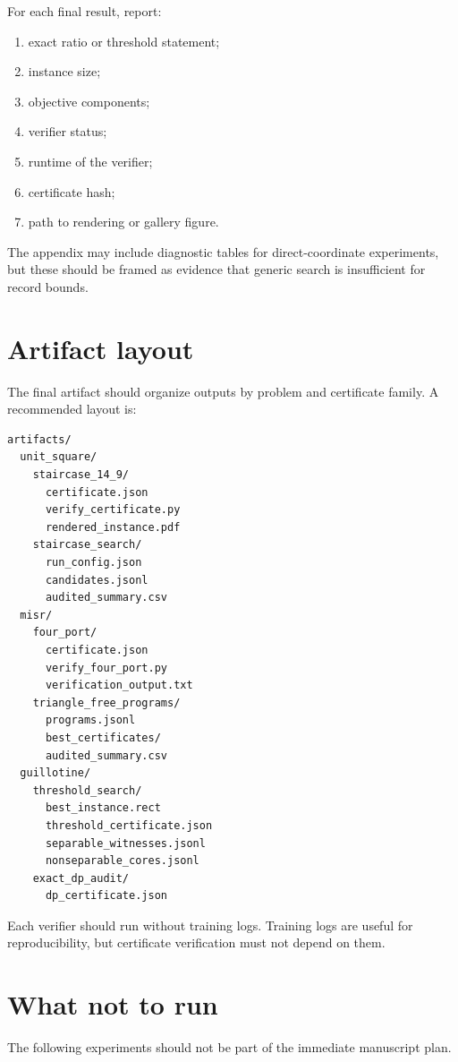 \documentclass[11pt]{article}
\begin{document}
For each final result, report:
\begin{enumerate}
\item exact ratio or threshold statement;
\item instance size;
\item objective components;
\item verifier status;
\item runtime of the verifier;
\item certificate hash;
\item path to rendering or gallery figure.
\end{enumerate}

The appendix may include diagnostic tables for direct-coordinate experiments,
but these should be framed as evidence that generic search is insufficient for
record bounds.

\section{Artifact layout}

The final artifact should organize outputs by problem and certificate family.
A recommended layout is:
\begin{verbatim}
artifacts/
  unit_square/
    staircase_14_9/
      certificate.json
      verify_certificate.py
      rendered_instance.pdf
    staircase_search/
      run_config.json
      candidates.jsonl
      audited_summary.csv
  misr/
    four_port/
      certificate.json
      verify_four_port.py
      verification_output.txt
    triangle_free_programs/
      programs.jsonl
      best_certificates/
      audited_summary.csv
  guillotine/
    threshold_search/
      best_instance.rect
      threshold_certificate.json
      separable_witnesses.jsonl
      nonseparable_cores.jsonl
    exact_dp_audit/
      dp_certificate.json
\end{verbatim}

Each verifier should run without training logs.  Training logs are useful for
reproducibility, but certificate verification must not depend on them.

\section{What not to run}

The following experiments should not be part of the immediate manuscript plan.
\end{document}
